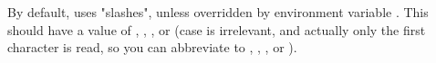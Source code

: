 \noindent{}By default, \display{} uses "slashes", unless overridden by
environment variable . This should have a
value of , , , or 
(case is irrelevant, and actually only the first character is read, so you can
abbreviate to , , , or ).

% 
% 
% 
% 
% 
